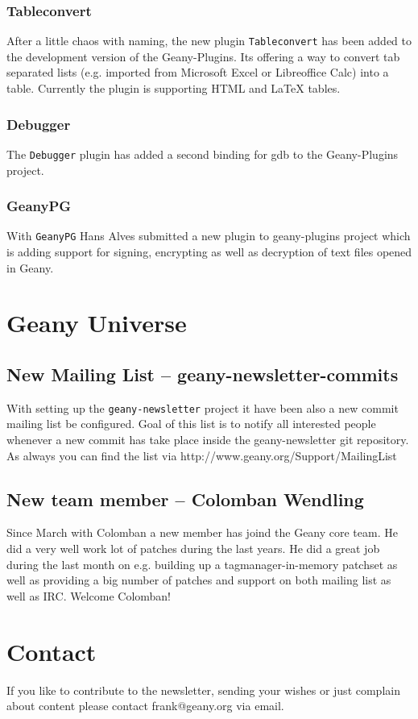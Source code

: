 \documentclass[%
paper=a4,%
fontsize=11pt,%
twoside=false,%
DIV18,
headsepline,
plainheadsepline,
footsepline,
plainfootsepline,
parskip=half,%
openany,%
]{scrartcl}
\begin{document}
\subsubsection{Tableconvert}

After a little chaos with naming, the new plugin \texttt{Tableconvert}
has been added to the development version of the Geany-Plugins. Its
offering a way to convert tab separated lists (e.g. imported
from Microsoft Excel or Libreoffice Calc) into a table. Currently the
plugin is supporting HTML and \LaTeX{} tables.

\subsubsection{Debugger}

The \texttt{Debugger} plugin has added a second binding for gdb to
the Geany-Plugins project.

\subsubsection{GeanyPG}

With \texttt{GeanyPG} Hans Alves submitted a new plugin to
geany-plugins project which is adding support for signing,
encrypting as well as decryption of text files opened in Geany.

\section{Geany Universe}

\subsection{New Mailing List -- geany-newsletter-commits}

With setting up the \texttt{geany-newsletter} project it have been
also a new commit mailing list be configured. Goal of this list is
to notify all interested people whenever a new commit has take place
inside the geany-newsletter git repository. As always you can find
the list via http://www.geany.org/Support/MailingList

\subsection{New team member -- Colomban Wendling}

Since March with Colomban a new member has joind the Geany core
team. He did a very well work  lot of patches during the last years.
He did a great job during the last month on e.g. building up a
tagmanager-in-memory patchset as well as providing a big number of
patches and support on both mailing list as well as IRC. Welcome
Colomban!


\section{Contact}

If you like to contribute to the newsletter, sending your wishes or
just complain about content please contact frank@geany.org via email.
\end{document}
